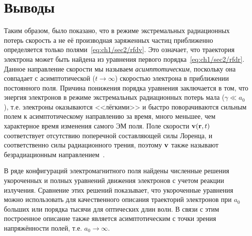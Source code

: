 \section{Выводы}
\label{ch1/sec5}

Таким образом, было показано, что в режиме экстремальных радиационных потерь скорость а не её производная заряженных частиц приближенно определяется только полями~\eqref{eq:ch1/sec2/rfdv}.
Это означает, что траектория электрона может быть найдена из уравнения первого порядка~\eqref{eq:ch1/sec2/rfdr}.
Данное направление скорости мы называем \textit{асимптотическим}, поскольку она совпадает с асимптотической ($t \to
\infty$) скоростью электрона в приближении постоянного поля.
Причина понижения порядка уравнения заключается в том, что энергия электронов в режиме экстремальных радиационных потерь мала ($\gamma \ll a_0$), т.е. электроны оказываются <<лёгкими>> и быстро поворачиваются сильным полем к асимптотическому направлению за время, много меньшее, чем характерное время изменения самого ЭМ поля.
Поле скорости ${\vb v}({\vb r}, t)$ соответствует отсутствию поперечной составляющей силы Лоренца, и соответственно силы радиационного трения, поэтому $\vb v$ также называют безрадиационным направлением~\cite{Gonoskov17}.

В ряде конфигураций электромагнитного поля найдены численные решения укороченных и полных уравнений движения электронов с учетом реакции излучения.
Сравнение этих решений показывает, что укороченные уравнения можно использовать для качественного описания траекторий электронов при $a_0$ больших или порядка тысячи для оптических длин волн.
В связи с этим построенное описание также является асимптотическим с точки зрения напряжённости полей, т.е. $a_0 \to \infty$.

